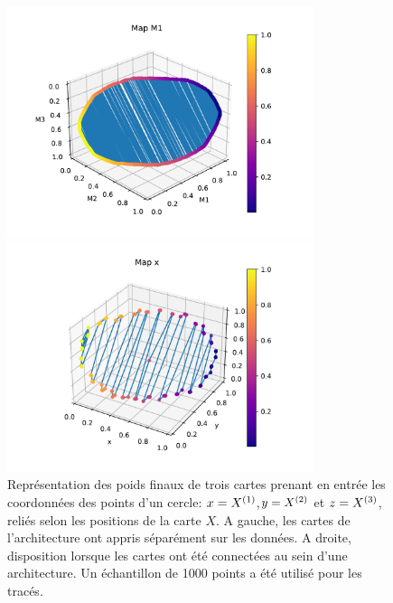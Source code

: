 \begin{figure}
\begin{minipage}{0.5\textwidth}
\centering\includegraphics[width=0.8\textwidth]{unco3som}
\end{minipage}
\begin{minipage}{0.5\textwidth}
\centering\includegraphics[width=0.8\textwidth]{disto_Mx}
\end{minipage}
\caption{Représentation des poids finaux de trois cartes prenant en entrée les coordonnées des points d'un cercle: $x = X^{({1})}$,$y = X^{({2})}$ et $z=X^{({3})}$, reliés selon les positions de la carte $X$. A gauche, les cartes de l'architecture ont appris séparément sur les données. A droite, disposition lorsque les cartes ont été connectées au sein d'une architecture. Un échantillon de 1000 points a été utilisé pour les tracés.}
\label{fig:distortion}
\end{figure}

